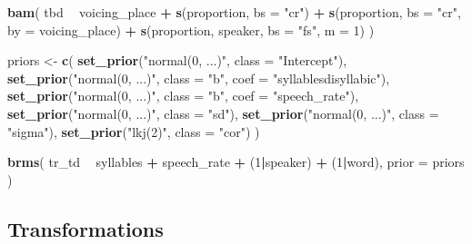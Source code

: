 \documentclass[11pt,]{article}
\newenvironment{Shaded}{\begin{snugshade}}{\end{snugshade}}
\newcommand{\KeywordTok}[1]{\textcolor[rgb]{0.13,0.29,0.53}{\textbf{#1}}}
\newcommand{\DataTypeTok}[1]{\textcolor[rgb]{0.13,0.29,0.53}{#1}}
\newcommand{\DecValTok}[1]{\textcolor[rgb]{0.00,0.00,0.81}{#1}}
\newcommand{\StringTok}[1]{\textcolor[rgb]{0.31,0.60,0.02}{#1}}
\newcommand{\OperatorTok}[1]{\textcolor[rgb]{0.81,0.36,0.00}{\textbf{#1}}}
\newcommand{\NormalTok}[1]{#1}
\begin{document}
\begin{Shaded}
\begin{Highlighting}[]
\KeywordTok{bam}\NormalTok{(}
\NormalTok{  tbd }\OperatorTok{~}
\StringTok{    }\NormalTok{voicing_place }\OperatorTok{+}
\StringTok{    }\KeywordTok{s}\NormalTok{(proportion, }\DataTypeTok{bs =} \StringTok{"cr"}\NormalTok{) }\OperatorTok{+}
\StringTok{    }\KeywordTok{s}\NormalTok{(proportion, }\DataTypeTok{bs =} \StringTok{"cr"}\NormalTok{, }\DataTypeTok{by =}\NormalTok{ voicing_place) }\OperatorTok{+}
\StringTok{    }\KeywordTok{s}\NormalTok{(proportion, speaker, }\DataTypeTok{bs =} \StringTok{"fs"}\NormalTok{, }\DataTypeTok{m =} \DecValTok{1}\NormalTok{)}
\NormalTok{)}
\end{Highlighting}
\end{Shaded}

\begin{Shaded}
\begin{Highlighting}[]
\NormalTok{priors <-}\StringTok{ }\KeywordTok{c}\NormalTok{(}
  \KeywordTok{set_prior}\NormalTok{(}\StringTok{"normal(0, ...)"}\NormalTok{, }\DataTypeTok{class =} \StringTok{"Intercept"}\NormalTok{),}
  \KeywordTok{set_prior}\NormalTok{(}\StringTok{"normal(0, ...)"}\NormalTok{, }\DataTypeTok{class =} \StringTok{"b"}\NormalTok{, }\DataTypeTok{coef =} \StringTok{"syllablesdisyllabic"}\NormalTok{),}
  \KeywordTok{set_prior}\NormalTok{(}\StringTok{"normal(0, ...)"}\NormalTok{, }\DataTypeTok{class =} \StringTok{"b"}\NormalTok{, }\DataTypeTok{coef =} \StringTok{"speech_rate"}\NormalTok{),}
  \KeywordTok{set_prior}\NormalTok{(}\StringTok{"normal(0, ...)"}\NormalTok{, }\DataTypeTok{class =} \StringTok{"sd"}\NormalTok{),}
  \KeywordTok{set_prior}\NormalTok{(}\StringTok{"normal(0, ...)"}\NormalTok{, }\DataTypeTok{class =} \StringTok{"sigma"}\NormalTok{),}
  \KeywordTok{set_prior}\NormalTok{(}\StringTok{"lkj(2)"}\NormalTok{, }\DataTypeTok{class =} \StringTok{"cor"}\NormalTok{)}
\NormalTok{)}

\KeywordTok{brms}\NormalTok{(}
\NormalTok{  tr_td }\OperatorTok{~}
\StringTok{    }\NormalTok{syllables }\OperatorTok{+}
\StringTok{    }\NormalTok{speech_rate }\OperatorTok{+}
\StringTok{    }\NormalTok{(}\DecValTok{1}\OperatorTok{|}\NormalTok{speaker) }\OperatorTok{+}
\StringTok{    }\NormalTok{(}\DecValTok{1}\OperatorTok{|}\NormalTok{word),}
  \DataTypeTok{prior =}\NormalTok{ priors}
\NormalTok{)}
\end{Highlighting}
\end{Shaded}

\subsection{Transformations}\label{transformations}
\end{document}
